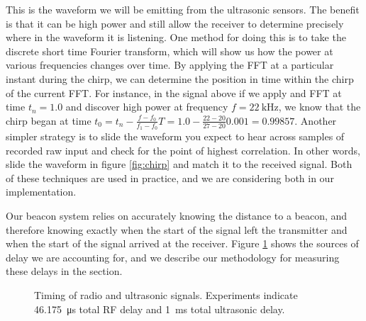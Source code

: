 \documentclass{article}
\begin{document}
        This is the waveform we will be emitting from the ultrasonic sensors. The benefit is that it can be high power and still allow the receiver to determine precisely where in the waveform it is listening. One method for doing this is to take the discrete short time Fourier transform, which will show us how the power at various frequencies changes over time. By applying the FFT at a particular instant during the chirp, we can determine the position in time within the chirp of the current FFT. For instance, in the signal above if we apply and FFT at time $t_n=1.0$ and discover high power at frequency $f=\SI{22}{\kilo\hertz}$, we know that the chirp began at time $t_0 = t_n - \tfrac{f - f_0}{f_1 - f_0}T = 1.0 - \tfrac{22-20}{27-20}0.001 = 0.99857$. Another simpler strategy is to slide the waveform you expect to hear across samples of recorded raw input and check for the point of highest correlation. In other words, slide the waveform in figure \ref{fig:chirp} and match it to the received signal. Both of these techniques are used in practice, and we are considering both in our implementation.

        Our beacon system relies on accurately knowing the distance to a beacon, and therefore knowing exactly when the start of the signal left the transmitter and when the start of the signal arrived at the receiver. Figure \ref{fig:rx_tx_timing} shows the sources of delay we are accounting for, and we describe our methodology for measuring these delays in the  section. \\

      \begin{figure}
        \centering
        \label{fig:rx_tx_timing}
        \caption{Timing of radio and ultrasonic signals. Experiments indicate \SI{46.175}{\micro\second} total RF delay and \SI{1}{\milli\second} total ultrasonic delay.}
      \end{figure}
\end{document}
